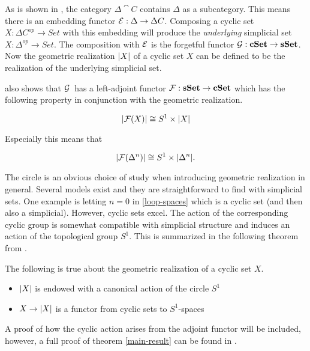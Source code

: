 \documentclass[../../main.tex]{subfiles}
\begin{document}
    As is shown in \cite{loday-cyclic}, the category $\Delta \cat{C}$ contains $\Delta$ as a subcategory. This means there is an embedding functor $\functor{E}: \Delta \to \Delta C$. Composing a cyclic set $X: \Delta C^{op} \to Set$ with this embedding will produce the \emph{underlying} simplicial set $X: \Delta^{op} \to Set$. The composition with $\functor{E}$ is the forgetful functor $\functor{G}: \cat{cSet} \to \cat{sSet}$. Now the geometric realization $\geom[X]$ of a cyclic set $X$ can be defined to be the realization of the underlying simplicial set.

    \cite{loday-cyclic} also shows that $\functor{G}$ has a left-adjoint functor $\functor{F}: \cat{sSet} \to \cat{cSet}$ which has the following property in conjunction with the geometric realization.

    \begin{equation*}
        \geom[\functor{F}(X)] \cong S^1 \times \geom[X]
    \end{equation*}

    Especially this means that 
    
    \begin{equation}\label{loop-spaces}
        \geom[\functor{F}(\Delta^n)] \cong S^1 \times \geom[\Delta^n].
    \end{equation}

    The circle is an obvious choice of study when introducing geometric realization in general. Several models exist and they are straightforward to find with simplicial sets. One example is letting $n = 0$ in \eqref{loop-spaces} which is a cyclic set (and then also a simplicial). However, cyclic sets excel. The action of the corresponding cyclic group is somewhat compatible with simplicial structure and induces an action of the topological group $S^1$. This is summarized in the following theorem from \cite{loday-cyclic}.

    \begin{theorem}\label{main-result}
        The following is true about the geometric realization of a cyclic set $X$.
        \begin{itemize}
            \item $\geom[X]$ is endowed with a canonical action of the circle $S^1$
            \item $X \to \geom[X]$ is a functor from cyclic sets to $S^1$-spaces
        \end{itemize}
    \end{theorem}

    A proof of how the cyclic action arises from the adjoint functor will be included, however, a full proof of theorem \ref{main-result} can be found in \cite{loday-cyclic}.
\end{document}
